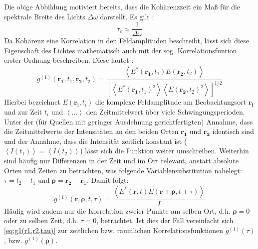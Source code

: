 Die obige Abbildung motiviert bereits, dass die Kohärenzzeit ein Maß für die spektrale Breite des Lichts $\Delta \omega$ darstellt. 
Es gilt \cite{foxQuantumOpticsIntroduction2006}:
\begin{equation}
    \tau_c  \approx \frac{1}{\Delta \omega}
    \label{eq:tau(delta nu)}
\end{equation}
Da Kohärenz eine Korrelation in den Feldamplituden beschreibt, lässt sich diese Eigenschaft des Lichtes mathematisch auch mit der sog. Korrelationsfuntion erster Ordnung beschreiben. 
Diese lautet \cite{foellmiIntensityInterferometrySecondorder2009}:
\begin{equation}
    g^{(1)}(\mathbf{r_1}, t_1, \mathbf{r_2}, t_2) = \frac{\left<E^*(\mathbf{r_1}, t_1)E(\mathbf{r_2}, t_2)\right>}{\left[\left<E^*(\mathbf{r_1}, t_1)^2\right> \left<E(\mathbf{r_2}, t_2)^2\right>\right]^{1/2}}
    \label{eq:g1(r1,t1,r2,t2)}
\end{equation}
Hierbei bezeichnet $E(\mathbf{r_i},t_i)$ die komplexe Feldamplitude am Beobachtungsort $\mathbf{r_i}$ und zur Zeit $t_i$ und $\left<\dots\right>$ den Zeitmittelwert über viele Schwingungsperioden. 
Unter der (für Quellen mit geringer Ausdehnung gerichtfertigten) Annahme, dass die Zeitmittelwerte der Intensitäten an den beiden Orten $\mathbf{r_1}$ und $\mathbf{r_2}$ identisch sind und der Annahme, dass die Intensität zeitlich konstant ist ($\left<I(t_1)\right>=\left<I(t_2)\right>$) lässt sich die Funktion weiter umschreiben. 
Weiterhin sind häufig nur Differenzen in der Zeit und im Ort relevant, anstatt absolute Orten und Zeiten zu betrachten, was folgende Variablensubstitution nahelegt: $\tau = t_2 -t_1$ und $\bm{\rho} = \mathbf{r_2} - \mathbf{r_1}$. 
Damit folgt:
\begin{equation}
    g^{(1)}(\mathbf{r}, \bm{\rho}, t, \tau) = \frac{\left<E^*(\mathbf{r}, t)E(\mathbf{r}+\bm{\rho}, t+\tau)\right>}{I}
    \label{eq:g1(r1,r2,tau)}
\end{equation}
Häufig wird zudem nur die Korrelation zweier Punkte am selben Ort, d.h. $\bm{\rho}=0$ oder zu selben Zeit, d.h. $\tau=0$, betrachtet. 
Ist dies der Fall vereinfacht sich \autoref{eq:g1(r1,r2,tau)} zur zeitlichen bzw. räumlichen Korrelationsfunktionen $g^{(1)}(\tau)$, bzw. $g^{(1)}(\bm{\rho})$.


